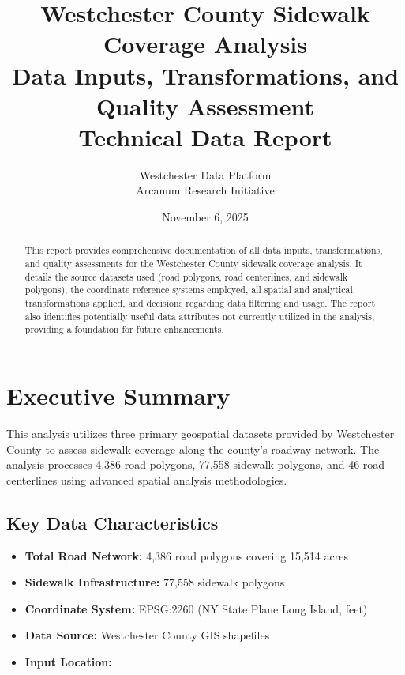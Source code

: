 \documentclass[11pt,letterpaper]{article}
\title{
    \vspace{-1cm}
    \textbf{Westchester County Sidewalk Coverage Analysis}\\
    \large Data Inputs, Transformations, and Quality Assessment\\
    \vspace{0.5cm}
    \normalsize Technical Data Report
}
\author{
    Westchester Data Platform\\
    Arcanum Research Initiative\\
    \texttt{}
}
\date{November 6, 2025}
\begin{document}
\maketitle
\thispagestyle{fancy}

\begin{abstract}
This report provides comprehensive documentation of all data inputs, transformations, and quality assessments for the Westchester County sidewalk coverage analysis. It details the source datasets used (road polygons, road centerlines, and sidewalk polygons), the coordinate reference systems employed, all spatial and analytical transformations applied, and decisions regarding data filtering and usage. The report also identifies potentially useful data attributes not currently utilized in the analysis, providing a foundation for future enhancements.
\end{abstract}

\tableofcontents
\newpage

\section{Executive Summary}

This analysis utilizes three primary geospatial datasets provided by Westchester County to assess sidewalk coverage along the county's roadway network. The analysis processes 4,386 road polygons, 77,558 sidewalk polygons, and 46 road centerlines using advanced spatial analysis methodologies.

\subsection{Key Data Characteristics}

\begin{itemize}
    \item \textbf{Total Road Network:} 4,386 road polygons covering 15,514 acres
    \item \textbf{Sidewalk Infrastructure:} 77,558 sidewalk polygons
    \item \textbf{Coordinate System:} EPSG:2260 (NY State Plane Long Island, feet)
    \item \textbf{Data Source:} Westchester County GIS shapefiles
    \item \textbf{Input Location:} \texttt{}
\end{itemize}
\end{document}
